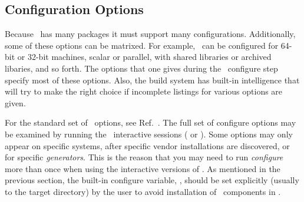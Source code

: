 \subsection{Configuration Options}
\label{sec:configuration_options}

Because \draco\ has many packages it must support many configurations.
Additionally, some of these options can be matrixed.  For example,
\draco\ can be configured for 64-bit or 32-bit machines, scalar or parallel, with shared libraries or
archived libaries, and so forth.  The options that one gives during the \cmake\ 
configure step specify most of these options. Also, the build
system has built-in intelligence that will try to make the right
choice if incomplete listings for various options are given.

For the standard set of \cmake\ options, see Ref.~\cite{cmake}.  The full set of configure options may be examined by running the \cmake\ interactive sessions ( or ).  Some options may only appear on specific systems, after specific vendor installations are discovered, or for specific {\it generators}.  This is the reason that you may need to run {\it configure} more than once when using the interactive versions of \cmake.
As mentioned in the previous section, the built-in configure variable, , should be set explicitly (usually to the target directory) by the
user to avoid installation of \draco\ components in \comp{/usr/local/}.

